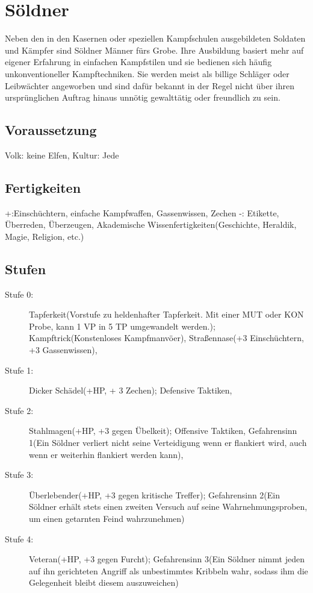\documentclass[a4paper,12pt,oneside]{book}
\begin{document}
\section{Söldner}
Neben den in den Kasernen oder speziellen Kampfschulen ausgebildeten Soldaten und Kämpfer sind Söldner Männer fürs Grobe. Ihre Ausbildung basiert mehr auf eigener Erfahrung in einfachen Kampfstilen und sie bedienen sich häufig unkonventioneller Kampftechniken. Sie werden meist als billige Schläger oder Leibwächter angeworben und sind dafür bekannt in der Regel nicht über ihren ursprünglichen Auftrag hinaus unnötig gewalttätig oder freundlich zu sein.
\subsection{Voraussetzung}
Volk: keine Elfen, Kultur: Jede
\subsection{Fertigkeiten}
+:Einschüchtern, einfache Kampfwaffen, Gassenwissen, Zechen
-: Etikette, Überreden, Überzeugen, Akademische Wissenfertigkeiten(Geschichte, Heraldik, Magie, Religion, etc.)
\subsection{Stufen}
\begin{description}
\item[Stufe 0:] Tapferkeit(Vorstufe zu heldenhafter Tapferkeit. Mit einer MUT oder KON Probe, kann 1 VP in 5 TP umgewandelt werden.); Kampftrick(Konstenloses Kampfmanvöer), Straßennase(+3 Einschüchtern, +3 Gassenwissen), 
\item[Stufe 1:] Dicker Schädel(+HP, + 3 Zechen); Defensive Taktiken,
\item[Stufe 2:] Stahlmagen(+HP, +3 gegen Übelkeit); Offensive Taktiken, Gefahrensinn 1(Ein Söldner verliert nicht seine Verteidigung wenn er flankiert wird, auch wenn er weiterhin flankiert werden kann), 
\item[Stufe 3:] Überlebender(+HP, +3 gegen kritische Treffer); Gefahrensinn 2(Ein Söldner erhält stets einen zweiten Versuch auf seine Wahrnehmungsproben, um einen getarnten Feind wahrzunehmen)
\item[Stufe 4:] Veteran(+HP, +3 gegen Furcht); Gefahrensinn 3(Ein Söldner nimmt jeden auf ihn gerichteten Angriff als unbestimmtes Kribbeln wahr, sodass ihm die Gelegenheit bleibt diesem auszuweichen)
\end{description}
\end{document}
